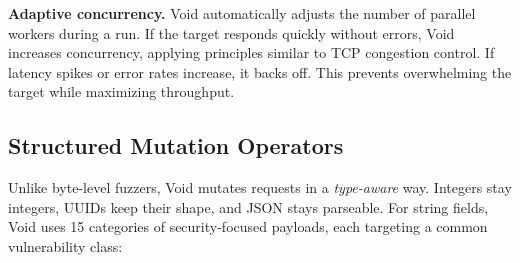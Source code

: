 \documentclass[conference]{IEEEtran}
\begin{document}
\begin{table}[htbp]
\caption{Key Fuzzer Settings}
\label{tab:settings}
\centering
\footnotesize
\setlength{\tabcolsep}{4pt}
\end{table}

\textbf{Adaptive concurrency.} Void automatically adjusts the number of parallel workers during a run. If the target responds quickly without errors, Void increases concurrency, applying principles similar to TCP congestion control. If latency spikes or error rates increase, it backs off. This prevents overwhelming the target while maximizing throughput.

\subsection{Structured Mutation Operators}
\label{sec:mutations}

Unlike byte-level fuzzers, Void mutates requests in a \emph{type-aware} way. Integers stay integers, UUIDs keep their shape, and JSON stays parseable. For string fields, Void uses 15 categories of security-focused payloads, each targeting a common vulnerability class:
\end{document}
